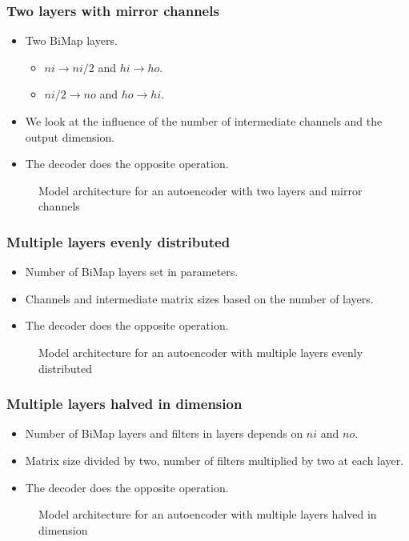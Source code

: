 \documentclass{beamer}
\begin{document}
\begin{frame}
\frametitle{Two layers with mirror channels}
\begin{itemize}
    \item Two BiMap layers.
        \begin{itemize}
            \item $ni\rightarrow ni/2$ and $hi\rightarrow ho$.
            \item $ni/2\rightarrow no$ and $ho\rightarrow hi$.
        \end{itemize}
        \item We look at the influence of the number of intermediate channels and the output dimension.
        \item The decoder does the opposite operation.
\end{itemize}
\begin{figure}
    \centering
    {\tiny
    
    \caption{Model architecture for an autoencoder with two layers and mirror channels}
    }
\end{figure}

\end{frame}


\begin{frame}
\frametitle{Multiple layers evenly distributed}
\begin{itemize}
    \item Number of BiMap layers set in parameters.
    \item Channels and intermediate matrix sizes based on the number of layers.
    \item The decoder does the opposite operation.
\end{itemize}
\begin{figure}
    \centering
    {\tiny
    
    \caption{Model architecture for an autoencoder with multiple layers evenly distributed}
    }
\end{figure}
\end{frame}

\begin{frame}
\frametitle{Multiple layers halved in dimension}
\begin{itemize}
    \item Number of BiMap layers and filters in layers depends on $ni$ and $no$.
    \item Matrix size divided by two, number of filters multiplied by two at each layer.
    \item The decoder does the opposite operation.
\end{itemize}
\begin{figure}
    \centering
    {\tiny
    
    }
    \caption{Model architecture for an autoencoder with multiple layers halved in dimension}
\end{figure}

\end{frame}
\end{document}
